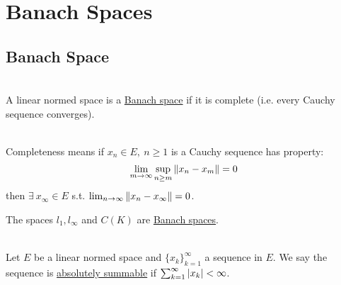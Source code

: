 \section{Banach Spaces}
\subsection{Banach Space}
\begin{definition}\ \\
A linear normed space is a \underline{Banach space} if it is complete (i.e. every Cauchy sequence converges).
\end{definition}
\begin{remark}\ \\
Completeness means if $x_n \in E,\ n \geq 1$ is a Cauchy sequence has property:
$$\lim_{m \to \infty} \sup_{n \geq m} \norm{x_n - x_m} = 0$$
then $\exists\ x_\infty \in E$ s.t. $\lim_{n \to \infty} \norm{x_n - x_\infty} = 0$.
\end{remark}
\begin{example}
The spaces $l_1, l_\infty$ and $C(K)$ are \underline{Banach spaces}.
\end{example}

\begin{remark}\ \\
Let $E$ be a linear normed space and $\{x_k\}_{k=1}^\infty$ a sequence in $E$. We say the sequence is \underline{absolutely summable} if $\sum_{k  =1}^\infty \abs{x_k} < \infty$.
\end{remark}

